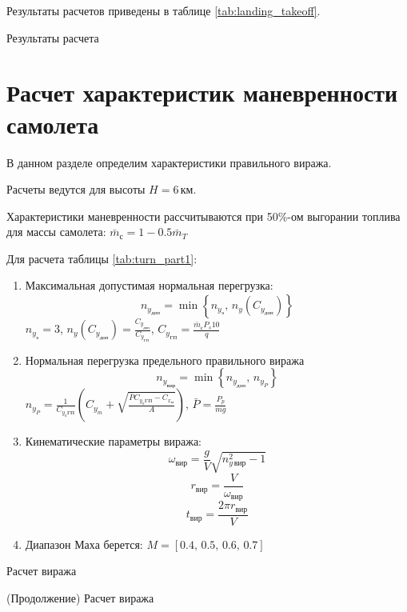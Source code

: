 Результаты расчетов приведены в таблице \ref{tab:landing_takeoff}. 

\begin{table}[H]
    \centering
    \caption{Результаты расчета}
    \label{tab:landing_takeoff}
    
\end{table}

\section{Расчет характеристик маневренности самолета}

В данном разделе определим характеристики правильного виража.

Расчеты ведутся для высоты $H=6\, \text{км}$.

Характеристики маневренности рассчитываются при 50\%-ом выгорании
топлива для массы самолета: $\bar{m}_с = 1 - 0.5 \bar{m}_T$

Для расчета таблицы \ref{tab:turn_part1}: 
\begin{enumerate}
    \item Максимальная допустимая нормальная перегрузка:
        \[
            n_{y_{доп}}=\min \left\{ n_{y_{э}},\,n_y(C_{y_{доп}}) \right\} 
        \]
        $n_{y_{э}} = 3$, $n_y(C_{y_{доп}}) = \frac{C_{y_{доп}}}{C_{y_{ГП}}}$,
        $C_{y_{ГП}} = \frac{\bar{m}_с P_s 10}{q}$
    \item Нормальная перегрузка предельного правильного виража
        \[
            n_{y_{вир}}=\min \left\{ n_{y_{доп}},\,n_{y_P} \right\} 
        \]
        $n_{y_{P}} = \frac{1}{C_{y_{a}ГП}} \left( C_{y_m} + \sqrt{
        \frac{\bar{P} C_{y_{a}ГП} - C_{x_{м}} }{A}} \right) $, $\bar{P} = \frac{P_p}{mg}$
    \item Кинематические параметры виража:
        \[
            \omega_{вир}  = \frac{g}{V} \sqrt{n_{y\, вир}^2 - 1}
        \]
        \[
            r_{вир} = \frac{V}{\omega_{вир}}
        \]
        \[
            t_{вир} = \frac{2 \pi r_{вир}}{V}
        \]
        \item Диапазон Маха берется:
            $M = [0.4,\, 0.5,\, 0.6,\,0.7]$
\end{enumerate}

\begin{table}[H]
    \centering
    \caption{Расчет виража}
    \label{tab:turn_part1}
    
\end{table}

\addtocounter{table}{-1}
\addtocounter{totaltables}{-1}
\begin{table}[H]
    \centering
    \caption{(Продолжение) Расчет виража}
    \label{tab:turn_part2}
    
\end{table}
 
